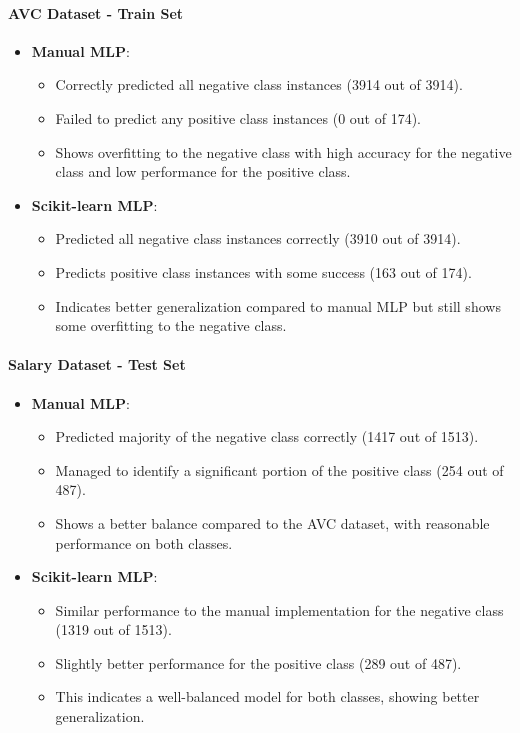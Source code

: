 \documentclass[a4paper,12pt]{article}
\begin{document}
\paragraph{AVC Dataset - Train Set}
\begin{itemize}
    \item \textbf{Manual MLP}:
    \begin{itemize}
        \item Correctly predicted all negative class instances (3914 out of 3914).
        \item Failed to predict any positive class instances (0 out of 174).
        \item Shows overfitting to the negative class with high accuracy for the negative class and low performance for the positive class.
    \end{itemize}
    \item \textbf{Scikit-learn MLP}:
    \begin{itemize}
        \item Predicted all negative class instances correctly (3910 out of 3914).
        \item Predicts positive class instances with some success (163 out of 174).
        \item Indicates better generalization compared to manual MLP but still shows some overfitting to the negative class.
    \end{itemize}
\end{itemize}

\paragraph{Salary Dataset - Test Set}
\begin{itemize}
    \item \textbf{Manual MLP}:
    \begin{itemize}
        \item Predicted majority of the negative class correctly (1417 out of 1513).
        \item Managed to identify a significant portion of the positive class (254 out of 487).
        \item Shows a better balance compared to the AVC dataset, with reasonable performance on both classes.
    \end{itemize}
    \item \textbf{Scikit-learn MLP}:
    \begin{itemize}
        \item Similar performance to the manual implementation for the negative class (1319 out of 1513).
        \item Slightly better performance for the positive class (289 out of 487).
        \item This indicates a well-balanced model for both classes, showing better generalization.
    \end{itemize}
\end{itemize}
\end{document}
